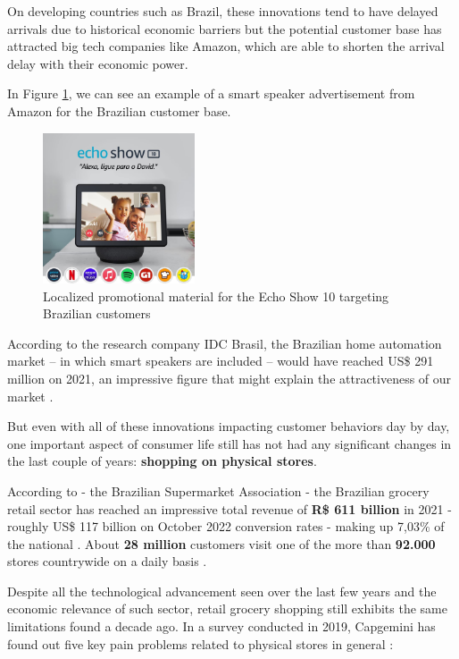 \documentclass[openright]{normas-utf-tex} %
\begin{document}
On developing countries such as Brazil, these innovations tend to
have delayed arrivals due to historical economic barriers but the potential
customer base has attracted big tech companies like Amazon, which are able
to shorten the arrival delay with their economic power.

In Figure \ref{fig:alexabr}, we can see an example of a smart speaker advertisement 
from Amazon for the Brazilian customer base.

\begin{figure}[h!]
	\centering
	\includegraphics[width=0.4\textwidth]{./images/alexabr.jpg} %
	\caption[Localized promotional material for the Echo Show 10 targeting Brazilian customers]{Localized promotional material for the Echo Show 10 targeting Brazilian customers}
    \label{fig:alexabr}
\end{figure}

According to the research company IDC Brasil, the Brazilian home automation
market -- in which smart speakers are included -- would have reached US\$ 291
million on 2021, an impressive figure that might explain the attractiveness of
our market \cite{IDCBrasil}.

But even with all of these innovations impacting customer behaviors day by day, one
important aspect of consumer life still has not had any significant changes in
the last couple of years: \textbf{shopping on
physical stores}.

According to  - the
Brazilian Supermarket Association - the Brazilian grocery retail sector has reached an
impressive total revenue of \textbf{R\$ 611 billion} in 2021 - roughly US\$ 117 billion on
October 2022 conversion rates - making up 7,03\% of the national . About \textbf{28 million} customers visit one of the more than
\textbf{92.000} stores countrywide on a daily basis \cite{Abras2022}.

Despite all the technological advancement seen over the last few years and the
economic relevance of such sector, retail grocery shopping still exhibits the
same limitations found a decade ago. In a survey conducted in 2019, Capgemini
has found out five key pain problems related to physical stores in general
\cite{Capgemini2020}:
\end{document}

